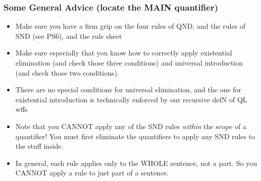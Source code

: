\begin{frame}
\frametitle{Some General Advice (locate the MAIN quantifier)}

\begin{itemize}[<+->]



\item Make sure you have a firm grip on the four rules of QND, and the rules of SND (see PS6), and the rule sheet

\item Make sure especially that you know how to correctly apply existential elimination (and check those three conditions) and universal introduction (and check those two conditions).

\item There are no special conditions for universal elimination, and the one for existential introduction is technically enforced by our recursive defN of QL wffs

\item Note that you CANNOT apply any of the SND rules {\it within} the scope of a quantifier! You must first eliminate the quantifiers to apply any SND rules to the stuff inside. 

\item In general, each rule applies only to the WHOLE sentence, not a part. So you CANNOT apply a rule to just part of a sentence. 

\end{itemize}
\end{frame}

